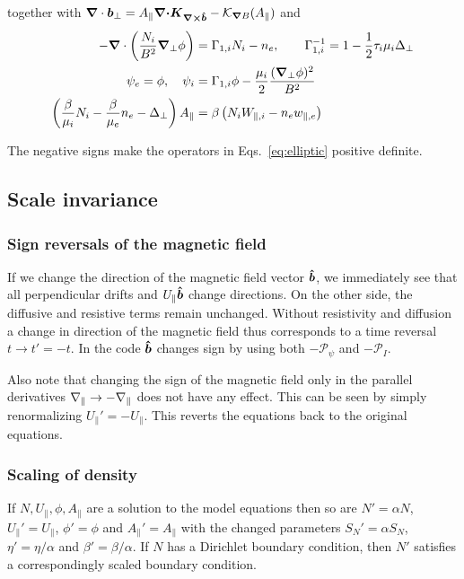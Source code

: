 together with
${\boldsymbol{\nabla}}\cdot { {\boldsymbol{b}}}_\perp = A_\parallel {\boldsymbol{{\boldsymbol{\nabla}}\cdot}}{\boldsymbol{ { K}_{{\boldsymbol{\nabla}}\times\bm{\hat{b}}}}} - \mathcal K_{{\boldsymbol{\nabla}} B}(A_\parallel) $
and
\begin{subequations} \label{eq:elliptic}
  \begin{align}
    -{\boldsymbol{\nabla}}\cdot\left( \frac{N_i}{B^2}{\boldsymbol{\nabla}}_{\perp} \phi \right) &= \Gamma_{1,i} N_i - n_e, \quad\quad
    \Gamma_{1,i}^{-1} = 1-\frac{1}{2}\tau_i\mu_i \Delta_\perp \\
    \psi_e = \phi, \quad \psi_i &= \Gamma_{1,i}\phi -\frac{\mu_i}{2}\frac{({\boldsymbol{\nabla}}_{\perp}\phi)^2}{B^2} \\
    \left(\frac{\beta}{\mu_i}N_i - \frac{\beta}{\mu_e}n_e-\Delta_\perp\right)
    A_\parallel &= \beta\left(N_iW_{\parallel,i}-n_e w_{\parallel,e}\right)
  \end{align}
\end{subequations}
\begin{tcolorbox}[title=Note]
The negative signs make the operators in Eqs.~\eqref{eq:elliptic} positive definite.
\end{tcolorbox}

\subsection{Scale invariance}
\subsubsection{Sign reversals of the magnetic field}\label{sec:field_reversal}
If we change the direction of the magnetic field vector $\bm{\hat{b}}$, we immediately see that all perpendicular
drifts and $U_\parallel\bm{\hat{b}}$ change directions. On the other side, the diffusive and resistive terms remain unchanged.
Without resistivity and diffusion a change in direction of the magnetic field thus corresponds to
a time reversal $t\rightarrow t'=-t$.
In the code $\bm{\hat{b}}$ changes sign by using both $-\mathcal P_\psi$ and $-\mathcal P_I$.

Also note that changing the sign of the magnetic field only in the parallel derivatives $\nabla_\parallel \rightarrow -\nabla_\parallel$ does not
have any effect. This can be seen by simply renormalizing $U_\parallel'=-U_\parallel$. This reverts the equations back to the original equations.
\subsubsection{Scaling of density}
If $N, U_\parallel, \phi, A_\parallel$ are a solution to the model equations
then so are $N'=\alpha N$, $U_\parallel'=U_\parallel$, $\phi'=\phi$ and $A_\parallel'=A_\parallel$ with the changed parameters $S_N' = \alpha S_N$, $\eta' = \eta/\alpha$ and $ \beta' = \beta/\alpha$. If $N$
has a Dirichlet boundary condition, then $N'$ satisfies a correspondingly scaled boundary condition.
